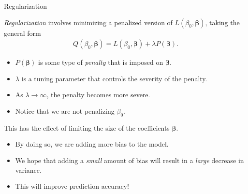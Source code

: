 \documentclass[8pt]{beamer}
\newcommand{\mys}{\vspace{0.5cm} %
}
\begin{document}
\begin{frame}{Regularization}

\textit{Regularization} involves minimizing a penalized version of $L(\beta_0, \bm{\beta})$, taking the general form 
\begin{align*}
    Q(\beta_0, \bm{\beta}) = L(\beta_0, \bm{\beta}) + \lambda P(\bm{\beta}).
\end{align*}
\begin{itemize}
    \item $P(\bm{\beta})$ is some type of \textit{penalty} that is imposed on $\bm{\beta}$.
    \item $\lambda$ is a tuning parameter that controls the severity of the penalty.
    \item As $\lambda \to \infty$, the penalty becomes more severe.
    \item Notice that we are not penalizing $\beta_0$.
\end{itemize} \mys 

This has the effect of limiting the size of the coefficients $\bm{\beta}$.
\begin{itemize}
    \item By doing so, we are adding more bias to the model.
    \item We hope that adding a \textit{small} amount of bias will result in a \textit{large} decrease in variance.
    \item This will improve prediction accuracy! 
\end{itemize}
    
\end{frame}
\end{document}
